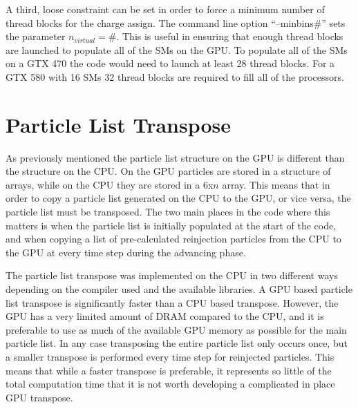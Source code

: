 A third, loose constraint can be set in order to force a minimum number of thread blocks for the charge assign. The command line option ``--minbins\#'' sets the parameter $n_{virtual} = \#$. This is useful in ensuring that enough thread blocks are launched to populate all of the SMs on the GPU. To populate all of the SMs on a GTX 470 the code would need to launch at least 28 thread blocks. For a GTX 580 with 16 SMs 32 thread blocks are required to fill all of the processors.  

	\section{Particle List Transpose}
As previously mentioned the particle list structure on the GPU is different than the structure on the CPU. On the GPU particles are stored in a structure of arrays, while on the CPU they are stored in a 6x$n$ array. This means that in order to copy a particle list generated on the CPU to the GPU, or vice versa, the particle list must be transposed. The two main places in the code where this matters is when the particle list is initially populated at the start of the code, and when copying a list of pre-calculated reinjection particles from the CPU to the GPU at every time step during the advancing phase.

The particle list transpose was implemented on the CPU in two different ways depending on the compiler used and the available libraries. A GPU based particle list transpose is significantly faster than a CPU based transpose. However, the GPU has a very limited amount of DRAM compared to the CPU, and it is preferable to use as much of the available GPU memory as possible for the main particle list. In any case transposing the entire particle list only occurs once, but a smaller transpose is performed every time step for reinjected particles. This means that while a faster transpose is preferable, it represents so little of the total computation time that it is not worth developing a complicated in place GPU transpose.  

